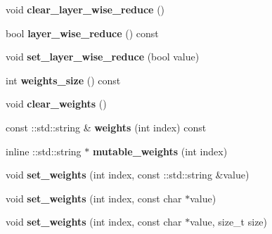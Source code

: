 \begin{DoxyCompactItemize}
void {\bfseries clear\+\_\+layer\+\_\+wise\+\_\+reduce} ()
\item 
\mbox{\label{classcaffe_1_1_solver_parameter_ae7d2e6596a8c2c2fa724433828afade6}} 
bool {\bfseries layer\+\_\+wise\+\_\+reduce} () const
\item 
\mbox{\label{classcaffe_1_1_solver_parameter_ab6486fb03e113a3bda2c3aa9c49a1fce}} 
void {\bfseries set\+\_\+layer\+\_\+wise\+\_\+reduce} (bool value)
\item 
\mbox{\label{classcaffe_1_1_solver_parameter_a004317c247cec3326e4a4545d240e852}} 
int {\bfseries weights\+\_\+size} () const
\item 
\mbox{\label{classcaffe_1_1_solver_parameter_aa00608415af9dbfc7ee1c2916a7ac849}} 
void {\bfseries clear\+\_\+weights} ()
\item 
\mbox{\label{classcaffe_1_1_solver_parameter_a87455d33a2f0f19e83de118ab6c22fed}} 
const \+::std\+::string \& {\bfseries weights} (int index) const
\item 
\mbox{\label{classcaffe_1_1_solver_parameter_ae52bac4a47c9e459124dae04cfaa6277}} 
inline \+::std\+::string $\ast$ {\bfseries mutable\+\_\+weights} (int index)
\item 
\mbox{\label{classcaffe_1_1_solver_parameter_a9c46cd37ade6df42d66207f87d738343}} 
void {\bfseries set\+\_\+weights} (int index, const \+::std\+::string \&value)
\item 
\mbox{\label{classcaffe_1_1_solver_parameter_aad3af83eb734268df982dc53838647e6}} 
void {\bfseries set\+\_\+weights} (int index, const char $\ast$value)
\item 
\mbox{\label{classcaffe_1_1_solver_parameter_a6fd6f9c4dee406d2af3f1b251eb05a0a}} 
void {\bfseries set\+\_\+weights} (int index, const char $\ast$value, size\+\_\+t size)
\item 
\mbox{\label{classcaffe_1_1_solver_parameter_a4f1fa297b0752392b6e5408193b330bb}} 

\end{DoxyCompactItemize}
